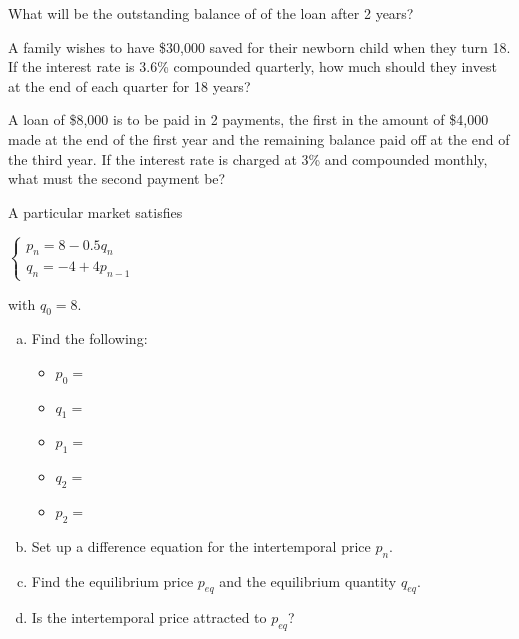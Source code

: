 \documentclass[12pt,legalpaper]{exam}
\newcommand{\p}{\noindent}
\newcommand{\vsp}{\vspace{0.5cm}}
\begin{document}
\begin{questions}
\begin{compactenum}[(a)]
\item What will be the outstanding balance of of the loan after 2 years?
\end{compactenum}
\newpage

\question[3] A family wishes to have \$30,000 saved for their newborn child when they turn 18.  If the interest rate is 3.6\% compounded quarterly, how much should they invest at the end of each quarter for 18 years?
\vspace{13cm}

\question[3] A loan of \$8,000 is to be paid in 2 payments, the first in the amount of \$4,000 made at the end of the first year and the remaining balance paid off at the end of the third year.  If the interest rate is charged at 3\% and compounded monthly, what must the second payment be?
\newpage

\question[7] A particular market satisfies
\begin{center}
$\begin{cases}p_{n} = 8 - 0.5q_{n}\\q_{n} = -4 + 4p_{n-1}\end{cases}$
\end{center}
\p with $q_{0} = 8$.
\vsp
\begin{enumerate}[(a)]
\item Find the following:
\vsp

\begin{itemize}[]
\item $p_{0} = $
\vsp

\item $q_{1} = $
\vsp

\item $p_{1} = $
\vsp

\item $q_{2} = $
\vsp

\item $p_{2} = $
\end{itemize}
\vsp

\item Set up a difference equation for the intertemporal price $p_{n}$.
\vspace{3cm}

\item Find the equilibrium price $p_{eq}$ and the equilibrium quantity $q_{eq}$.
\vspace{3cm}

\item Is the intertemporal price attracted to $p_{eq}$?
\vspace{3cm}


\end{enumerate}
\end{questions}
\end{document}
